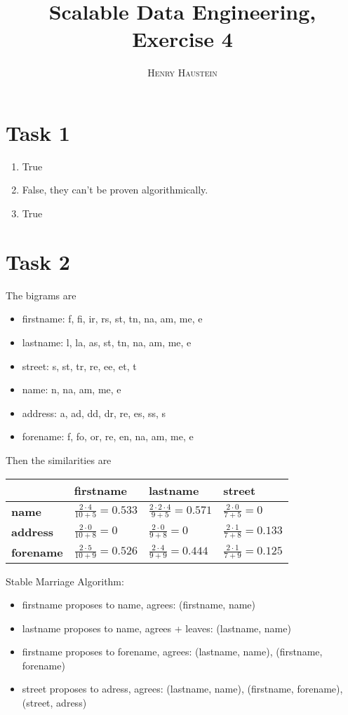 \documentclass{article}
\title{\textbf{Scalable Data Engineering, Exercise 4}}
\author{\textsc{Henry Haustein}}
\date{}
\begin{document}
	\maketitle
	
	\section*{Task 1}
	\begin{enumerate}[label=(\alph*)]
		\item True
		\item False, they can't be proven algorithmically.
		\item True
	\end{enumerate}

	\section*{Task 2}
	The bigrams are
	\begin{itemize}
		\item firstname: f, fi, ir, rs, st, tn, na, am, me, e
		\item lastname: l, la, as, st, tn, na, am, me, e
		\item street: s, st, tr, re, ee, et, t
		\item name: n, na, am, me, e
		\item address: a, ad, dd, dr, re, es, ss, s
		\item forename: f, fo, or, re, en, na, am, me, e
	\end{itemize}
	Then the similarities are
	\begin{center}
		\begin{tabular}{l|l|l|l}
			& \textbf{firstname} & \textbf{lastname} & \textbf{street} \\
			\hline
			\textbf{name} & $\frac{2\cdot 4}{10+5}=0.533$ & $\frac{2\cdot 2\cdot 4}{9+5}=0.571$ & $\frac{2\cdot 0}{7+5}=0$ \\
			\hline
			\textbf{address} & $\frac{2\cdot 0}{10+8}=0$ & $\frac{2\cdot 0}{9+8}=0$ & $\frac{2\cdot 1}{7+8}=0.133$ \\
			\hline
			\textbf{forename} & $\frac{2\cdot 5}{10+9}=0.526$ & $\frac{2\cdot 4}{9+9}=0.444$ & $\frac{2\cdot 1}{7+9}=0.125$
		\end{tabular}
	\end{center}
	Stable Marriage Algorithm:
	\begin{itemize}
		\item firstname proposes to name, agrees: (firstname, name)
		\item lastname proposes to name, agrees + leaves: (lastname, name)
		\item firstname proposes to forename, agrees: (lastname, name), (firstname, forename)
		\item street proposes to adress, agrees: (lastname, name), (firstname, forename), (street, adress)
	\end{itemize}
\end{document}
